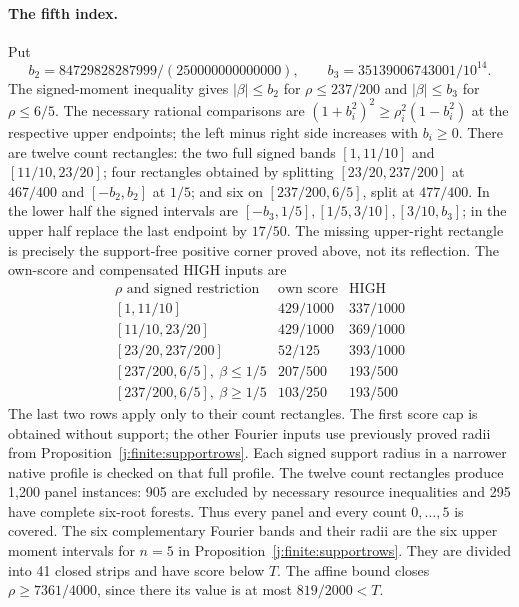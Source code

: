 \paragraph{The fifth index.}
Put
\[
 b_2=84729828287999/(250000000000000),\qquad
 b_3=35139006743001/10^{14}.
\]
The signed-moment inequality gives $|\beta|\le b_2$ for
$\rho\le237/200$ and $|\beta|\le b_3$ for $\rho\le6/5$.
The necessary rational comparisons are
$(1+b_i^2)^2\ge\rho_i^2(1-b_i^2)$ at the respective upper endpoints;
the left minus right side increases with $b_i\ge0$.
There are twelve count rectangles: the two full signed bands
$[1,11/10]$ and $[11/10,23/20]$; four rectangles obtained by splitting
$[23/20,237/200]$ at $467/400$ and $[-b_2,b_2]$ at $1/5$;
and six on $[237/200,6/5]$, split at $477/400$.
In the lower half the signed intervals are
$[-b_3,1/5],[1/5,3/10],[3/10,b_3]$; in the upper half replace the
last endpoint by $17/50$. The missing upper-right rectangle is precisely
the support-free positive corner proved above, not its reflection.
The own-score and compensated HIGH inputs are
\[
\begin{array}{c|cc}
\rho\text{ and signed restriction}&\text{own score}&\text{HIGH}\\\hline
{}[1,11/10]&429/1000&337/1000\\
{}[11/10,23/20]&429/1000&369/1000\\
{}[23/20,237/200]&52/125&393/1000\\
{}[237/200,6/5],\ \beta\le1/5&207/500&193/500\\
{}[237/200,6/5],\ \beta\ge1/5&103/250&193/500
\end{array}
\]
The last two rows apply only to their count rectangles. The first score
cap is obtained without support; the other Fourier inputs use previously
proved radii from Proposition~\ref{j:finite:supportrows}. Each signed
support radius in a narrower native profile is checked on that full profile.
The twelve count rectangles produce 1,200 panel instances: 905 are
excluded by necessary resource inequalities and 295 have complete
six-root forests. Thus every panel and every count $0,\ldots,5$ is covered.
The six complementary Fourier bands and their radii are the six upper
moment intervals for $n=5$ in Proposition~\ref{j:finite:supportrows}.
They are divided into 41 closed strips and have score below $T$.
The affine bound closes $\rho\ge7361/4000$, since there its value is
at most $819/2000<T$.

